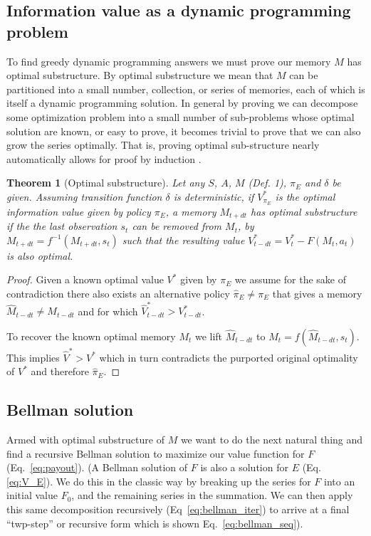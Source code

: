 \documentclass[9pt,lineno]{elife}
\newtheorem{theorem}{Theorem}
\begin{document}
\subsection*{Information value as a dynamic programming problem} To find greedy dynamic programming \citep{Roughgarden2019,Sutton2018} answers we must prove our memory $M$ has optimal substructure. By optimal substructure we mean that $M$ can be partitioned into a small number, collection, or series of memories, each of which is itself a dynamic programming solution. In general by proving we can decompose some optimization problem into a small number of sub-problems whose optimal solution are known, or easy to prove, it becomes trivial to prove that we can also grow the series optimally. That is, proving optimal sub-structure nearly automatically allows for proof by induction \citep{Roughgarden2019}. 

\begin{theorem}[Optimal substructure] \label{theorem:opt_sub} 
    Let any $S$, $A$, $M$ (Def. 1), $\pi_E$ and $\delta$ be given. Assuming transition function $\delta$ is deterministic, if $V^*_{\pi_E}$ is the optimal information value given by policy $\pi_E$, a memory $M_{t+dt}$ has optimal substructure if the the last observation $s_t$ can be removed from $M_t$, by $M_{t+dt} = f^{-1}(M_{t+dt}, s_t)$ such that the resulting value $V^*_{t-dt} = V^*_{t} - F(M_t, a_t)$ is also optimal. 
\end{theorem}
\begin{proof}
	Given a known optimal value $V^*$ given by $\pi_E$ we assume for the sake of contradiction there also exists an alternative policy $\hat \pi_E \neq \pi_E$ that gives a memory $\hat M_{t-dt} \neq M_{t-dt}$ and for which $\hat V^*_{t-dt} > V^*_{t-dt}$. 
	
	To recover the known optimal memory $M_t$ we lift $\hat M_{t-dt}$ to $M_t = f(\hat M_{t-dt}, s_t)$. This implies $\hat V^* > V^*$ which in turn contradicts the purported original optimality of $V^*$ and therefore $\hat \pi_E$.
\end{proof}

\subsection*{Bellman solution} Armed with optimal substructure of $M$ we want to do the next natural thing and find a recursive Bellman solution to maximize our value function for $F$ (Eq.~\ref{eq:payout}). (A Bellman solution of $F$ is also a solution for $E$ (Eq.\ref{eq:V_E}). We do this in the classic way by breaking up the series for $F$ into an initial value $F_0$, and the remaining series in the summation. We can then apply this same decomposition recursively (Eq~\ref{eq:bellman_iter}) to arrive at a final ``twp-step'' or recursive form which is shown Eq.~\ref{eq:bellman_seq}). 
\end{document}
